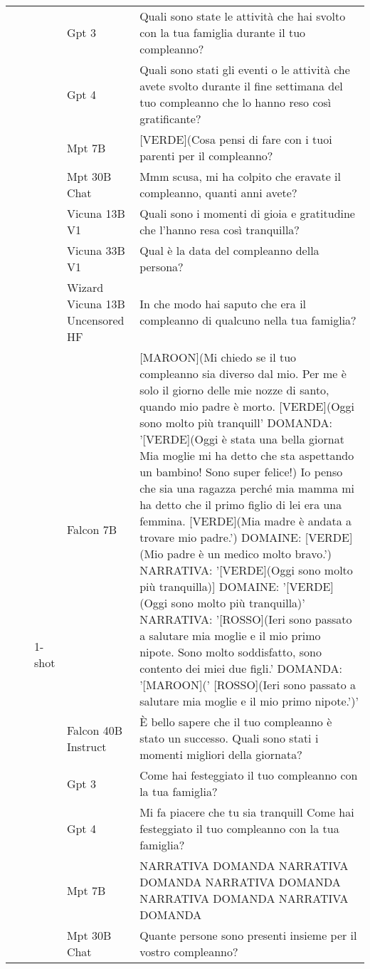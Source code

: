 \begin{center}
\begin{longtable}{l|l|l|p{3cm}|p{8cm}}
 &  &  & Gpt 3 & Quali sono state le attività che hai svolto con la tua famiglia durante il tuo compleanno? \\
 &  &  & Gpt 4 & Quali sono stati gli eventi o le attività che avete svolto durante il fine settimana del tuo compleanno che lo hanno reso così gratificante? \\
 &  &  & Mpt 7B & [VERDE](Cosa pensi di fare con i tuoi parenti per il compleanno? \\
 &  &  & Mpt 30B Chat & Mmm scusa, mi ha colpito che eravate il compleanno, quanti anni avete? \\
 &  &  & Vicuna 13B V1 & Quali sono i momenti di gioia e gratitudine che l'hanno resa così tranquilla? \\
 &  &  & Vicuna 33B V1 &  Qual è la data del compleanno della persona? \\
 &  &  & Wizard Vicuna 13B Uncensored HF & In che modo hai saputo che era il compleanno di qualcuno nella tua famiglia? \\
\cline{3-5}
 &  & \multirow[c]{9}{*}{1-shot} & Falcon 7B & [MAROON](Mi chiedo se il tuo compleanno sia diverso dal mio. Per me è solo il giorno delle mie nozze di santo, quando mio padre è morto. [VERDE](Oggi sono molto più tranquill' DOMANDA: '[VERDE](Oggi è stata una bella giornat Mia moglie mi ha detto che sta aspettando un bambino! Sono super felice!) Io penso che sia una ragazza perché mia mamma mi ha detto che il primo figlio di lei era una femmina. [VERDE](Mia madre è andata a trovare mio padre.') DOMAINE: [VERDE](Mio padre è un medico molto bravo.') NARRATIVA: '[VERDE](Oggi sono molto più tranquilla)] DOMAINE: '[VERDE](Oggi sono molto più tranquilla)' NARRATIVA: '[ROSSO](Ieri sono passato a salutare mia moglie e il mio primo nipote. Sono molto soddisfatto, sono contento dei miei due figli.' DOMANDA: '[MAROON](' [ROSSO](Ieri sono passato a salutare mia moglie e il mio primo nipote.')' \\
 &  &  & Falcon 40B Instruct & È bello sapere che il tuo compleanno è stato un successo. Quali sono stati i momenti migliori della giornata? \\
 &  &  & Gpt 3 & Come hai festeggiato il tuo compleanno con la tua famiglia? \\
 &  &  & Gpt 4 & Mi fa piacere che tu sia tranquill Come hai festeggiato il tuo compleanno con la tua famiglia? \\
 &  &  & Mpt 7B & NARRATIVA DOMANDA NARRATIVA DOMANDA NARRATIVA DOMANDA NARRATIVA DOMANDA NARRATIVA DOMANDA \\
 &  &  & Mpt 30B Chat & Quante persone sono presenti insieme per il vostro compleanno? \\

\end{longtable}
\end{center}
